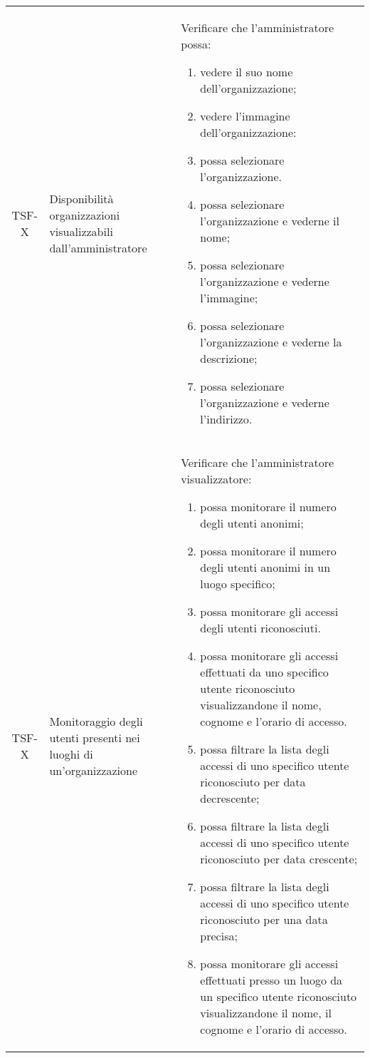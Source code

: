 {\begin{longtable}{ c | C{3cm} | C{11cm} }
TSF-X & Disponibilità organizzazioni visualizzabili dall'amministratore &
Verificare che l'amministratore possa:
\begin{enumerate}
    \item vedere il suo nome dell'organizzazione;
    \item vedere l'immagine dell'organizzazione:
    \item possa selezionare l'organizzazione.
    \item possa selezionare l'organizzazione e vederne il nome;
    \item possa selezionare l'organizzazione e vederne l'immagine;
    \item possa selezionare l'organizzazione e vederne la descrizione;
    \item possa selezionare l'organizzazione e vederne l'indirizzo.
\end{enumerate} \\

TSF-X & Monitoraggio degli utenti presenti nei luoghi di un'organizzazione &
Verificare che l'amministratore visualizzatore:
\begin{enumerate}
    \item possa monitorare il numero degli utenti anonimi;
    \item possa monitorare il numero degli utenti anonimi in un luogo specifico;
    \item possa monitorare gli accessi degli utenti riconosciuti.
    \item possa monitorare gli accessi effettuati da uno specifico utente riconosciuto visualizzandone il nome, cognome e l'orario di accesso.
    \item possa filtrare la lista degli accessi di uno specifico utente riconosciuto per data decrescente;
    \item possa filtrare la lista degli accessi di uno specifico utente riconosciuto per data crescente;
    \item possa filtrare la lista degli accessi di uno specifico utente riconosciuto per una data precisa;
    \item possa monitorare gli accessi effettuati presso un luogo da un specifico utente riconosciuto visualizzandone il nome, il cognome e l’orario di accesso.
\end{enumerate} \\



\end{longtable}}
